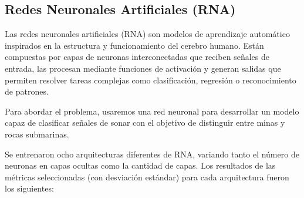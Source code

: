 \documentclass[a4paper,10pt]{article}
\begin{document}
    \subsection{Redes Neuronales Artificiales (RNA)}
    Las redes neuronales artificiales (RNA) son modelos de aprendizaje automático inspirados en la estructura y funcionamiento del cerebro humano. Están compuestas por capas de neuronas interconectadas que reciben señales de entrada, las procesan mediante funciones de activación y generan salidas que permiten resolver tareas complejas como clasificación, regresión o reconocimiento de patrones. 

    Para abordar el problema, usaremos una red neuronal para desarrollar un modelo capaz de clasificar señales de sonar con el objetivo de distinguir entre minas y rocas submarinas.
    
    Se entrenaron ocho arquitecturas diferentes de RNA, variando tanto el 	número de neuronas en capas ocultas como la cantidad de capas. Los resultados de las métricas seleccionadas (con desviación estándar) para cada arquitectura fueron los siguientes:
    
\end{document}
